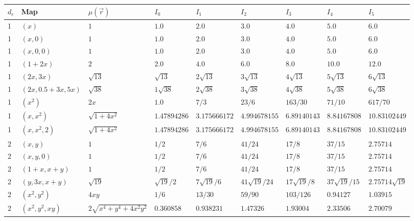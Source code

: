 \documentclass[12pt]{article}
\begin{document}
\begin{landscape}

\begin{center}
\begin{tabular}{ | l | l | l | l | l | l | l | l | l |}
  \hline
  $d_e$ & Map & $\mu(\vec{r})$ & $I_0$ & $I_1$ & $I_2$ & $I_3$ & $I_4$ & $I_5$ \\ \hline
  1 & $(x)$                & $1$ & $1.0$ & $2.0$ & $3.0$ & $4.0$ & $5.0$ & $6.0$ \\ \hline
  1 & $(x,0)$              & $1$ & $1.0$ & $2.0$ & $3.0$ & $4.0$ & $5.0$ & $6.0$ \\ \hline
  1 & $(x,0,0)$            & $1$ & $1.0$ & $2.0$ & $3.0$ & $4.0$ & $5.0$ & $6.0$ \\ \hline
  1 & $(1+2x)$             & $2$ & $2.0$ & $4.0$ & $6.0$ & $8.0$ & $10.0$ & $12.0$ \\ \hline
  1 & $(2x,3x)$            & $\sqrt{13}$ & $\sqrt{13}$ & $2\sqrt{13}$ & $3\sqrt{13}$ & $4\sqrt{13}$ & $5\sqrt{13}$ & $6\sqrt{13}$ \\ \hline
  1 & $(2x,0.5+3x,5x)$     & $\sqrt{38}$ & $1\sqrt{38}$ & $2\sqrt{38}$ & $3\sqrt{38}$ & $4\sqrt{38}$ & $5\sqrt{38}$ & $6\sqrt{38}$ \\ \hline
  1 & $(x^2)$              & $2x$ & $1.0$ & $7/3$ & $23/6$ & $163/30$ & $71/10$ & $617/70$ \\ \hline
  1 & $(x,x^2)$            & $\sqrt{1 + 4x^2}$ & $1.47894286$ & $3.175666172$ & $4.994678155$ & $6.89140143$ & $8.84167808$ & $10.83102449$ \\ \hline
  1 & $(x,x^2,2)$          & $\sqrt{1 + 4x^2}$ & $1.47894286$ & $3.175666172$ & $4.994678155$ & $6.89140143$ & $8.84167808$ & $10.83102449$ \\ \hline
  2 & $(x,y)$              & $1$ & $1/2$ & $7/6$ & $41/24$ & $17/8$ & $37/15$ & $2.75714$ \\ \hline
  2 & $(x,y,0)$            & $1$ & $1/2$ & $7/6$ & $41/24$ & $17/8$ & $37/15$ & $2.75714$ \\ \hline
  2 & $(1+x,x+y)$          & $1$ & $1/2$ & $7/6$ & $41/24$ & $17/8$ & $37/15$ & $2.75714$ \\ \hline
  2 & $(y,3x,x+y)$         & $\sqrt{19}$ & $\sqrt{19}/2$ & $7\sqrt{19}/6$ & $41\sqrt{19}/24$ & $17\sqrt{19}/8$ & $37\sqrt{19}/15$ & $2.75714 \sqrt{19}$ \\ \hline
  2 & $(x^2,y^2)$          & $4xy$ & $1/6$ & $13/30$ & $59/90$ & $103/126$ & $0.94127$ & $1.03915$ \\ \hline
  2 & $(x^2,y^2,xy)$       & $2\sqrt{x^4+y^4+4x^2 y^2}$ & $0.360858$ & $0.938231$ & $1.47326$ & $1.93004$ & $2.33506$ & $2.70079$ \\ \hline

\end{tabular}
\end{center}
\end{landscape}
\end{document}
